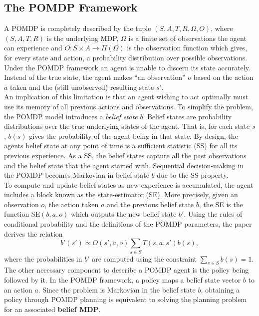 \documentclass{article}
\begin{document}
\subsection*{The POMDP Framework}
A POMDP is completely described by the tuple $(S, A, T, R, \Omega, O)$, where \\ $(S, A, T, R)$ is the underlying MDP, $\Omega$ is a finite set of observations the agent can experience and $O:S \times A \rightarrow \Pi(\Omega)$ is the observation function which gives, for every state and action, a probability distribution over possible observations. Under the POMDP framework an agent is unable to discern its state accurately. Instead of the true state, the agent makes ``an observation'' $o$ based on the action $a$ taken and the (still unobserved) resulting state $s'$.\\
An implication of this limitation is that an agent wishing to act optimally must use its memory of all previous actions and observations. To simplify the problem, the POMDP model introduces a \textit{belief state} $b$. Belief states are probability distributions over the true underlying states of the agent. That is, for each state $s$, $b(s)$ gives the probability of the agent being in that state. By design, the agents belief state at any point of time is a sufficient statistic (SS) for all its previous experience. As a SS, the belief states capture all the past observations and the belief state that the agent started with. Sequential decision-making in the POMDP becomes Markovian in belief state $b$ due to the SS property.\\ 
To compute and update belief states as new experience is accumulated, the agent includes a block known as the state-estimator (SE). More precisely, given an observation $o$, the action taken $a$ and the previous belief state $b$, the SE is the function SE$(b, a, o)$ which outputs the new belief state $b'$. Using the rules of conditional probability and the definitions of the POMDP parameters, the paper derives the relation 
$$b'(s') \propto O(s', a, o)\sum_{s \in S}T(s, a, s')b(s),$$
where the probabilities in $b'$ are computed using the constraint $\sum_{s \in S}b(s) = 1$.\\
The other necessary component to describe a POMDP agent is the policy being followed by it. In the POMDP framework, a policy maps a belief state vector $b$ to an action $a$. Since the problem is Markovian in the belief state $b$, obtaining a policy through POMDP planning is equivalent to solving the planning problem for an associated \textbf{belief MDP}.\\
\end{document}
